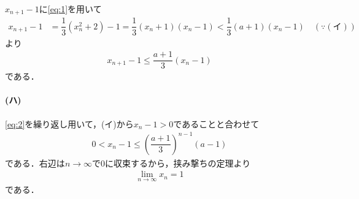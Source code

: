 \documentclass[../../main.tex]{subfiles}
\begin{document}
$x_{n+1}-1$に\cref{eq:1}を用いて
\begin{align}
  x_{n+1} - 1
  &= \dfrac{1}{3}(x_n^2 + 2) - 1
  = \dfrac{1}{3}(x_n + 1)(x_n - 1)
  < \dfrac{1}{3}(a + 1)(x_n - 1) \quad (\because (\text{イ}))
\end{align}
より
\begin{align}
  x_{n+1} -1 \le \dfrac{a+1}{3}(x_n-1) \label{eq:2}
\end{align}
である．

\paragraph{(ハ)}

\cref{eq:2}を繰り返し用いて，(イ)から$x_n-1>0$であることと合わせて
\begin{align}
  0 < x_n - 1 \le \left(\dfrac{a+1}{3}\right)^{n-1}(a - 1)
\end{align}
である．右辺は$n\to\infty$で$0$に収束するから，挟み撃ちの定理より
\begin{align}
  \lim_{n\to\infty} x_n = 1
\end{align}
である．
\end{document}
